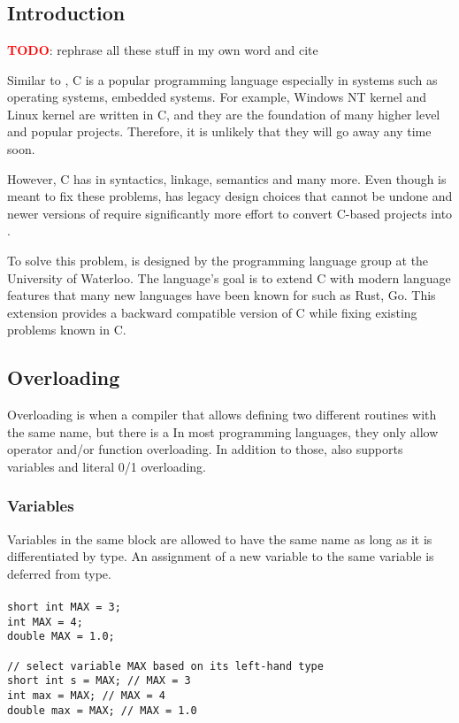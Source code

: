 \chapter{\CFA} \label{CFA}
\section{Introduction}
\textbf{\textcolor{red}{TODO}}: rephrase all these stuff in my own word and cite

Similar to \CC, C is a popular programming language especially in systems such
as operating systems, embedded systems. For example, Windows NT kernel and
Linux kernel are written in C, and they are the foundation of many higher level
and popular projects. Therefore, it is unlikely that they will go away any time soon.

However, C has in syntactics, linkage, semantics and many
more. Even though \CCS is meant to fix these problems, \CCS has legacy design
choices that cannot be undone and newer versions of \CCS require significantly
more effort to convert C-based projects into \CCS.

To solve this problem, \CFAS is designed by the programming language group at the
University of Waterloo. The language's goal is to extend C with modern language
features that many new languages have been known for such as Rust, Go. This
extension provides a backward compatible version of C while fixing existing
problems known in C.

\section{Overloading}
Overloading is when a compiler that allows defining two different routines with
the same name, but there is a
In most programming languages, they only allow operator and/or function overloading.
In addition to those, \uCPP also supports variables and literal 0/1 overloading.

\subsection{Variables}
Variables in the same block are allowed to have the same name as long as it is
differentiated by type. An assignment of a new variable to the same variable is
deferred from type.
\begin{frame}
\frametitle{}
\begin{lstlisting}
short int MAX = 3;
int MAX = 4;
double MAX = 1.0;

// select variable MAX based on its left-hand type
short int s = MAX; // MAX = 3
int max = MAX; // MAX = 4
double max = MAX; // MAX = 1.0
\end{lstlisting}
\end{frame}

